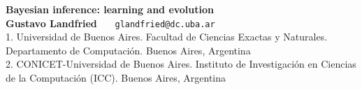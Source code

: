 \documentclass[a0,portrait]{a0poster} %
\begin{document}
% 
%  

\centering \fontsize{90}{90} \textbf{Bayesian inference: learning and  evolution} \\[0.5cm]  %
\LARGE \textbf{Gustavo Landfried}  \ \ \  \texttt{glandfried@dc.uba.ar} \\
\large 1. Universidad de Buenos Aires. Facultad de Ciencias Exactas y Naturales. Departamento de Computaci\'on. Buenos Aires, Argentina \\ 
\large 2. CONICET-Universidad de Buenos Aires. Instituto de Investigaci\'on en Ciencias de la Computaci\'on (ICC). Buenos Aires, Argentina \\


\vspace{0cm}
\end{document}
